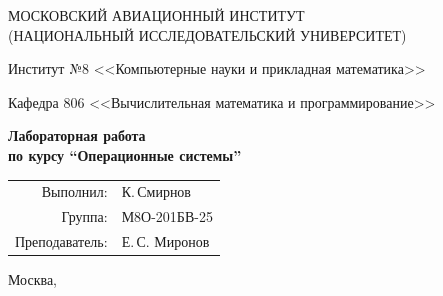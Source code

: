 \begin{titlepage}
\begin{center}
\large
МОСКОВСКИЙ АВИАЦИОННЫЙ ИНСТИТУТ\\ (НАЦИОНАЛЬНЫЙ ИССЛЕДОВАТЕЛЬСКИЙ УНИВЕРСИТЕТ)

\vspace{20pt}

Институт №8 <<Компьютерные науки и прикладная математика>>

Кафедра 806 <<Вычислительная математика и программирование>>
\end{center}

\vspace{60pt}

\begin{center}
\bfseries
\large
Лабораторная работа  \\по курсу \enquote{Операционные системы}

\vspace{54pt}

\end{center}

\vfill

\begin{flushright}
\large
\begin{tabular}{rl}
Выполнил: & К.\,Смирнов \\
Группа: & М8О-201БВ-25 \\
Преподаватель: & Е.\,С. Миронов \\
\end{tabular}
\end{flushright}

\vspace{92pt}

\begin{center}
\large
Москва, \the\year
\end{center}
\end{titlepage}

\pagebreak
